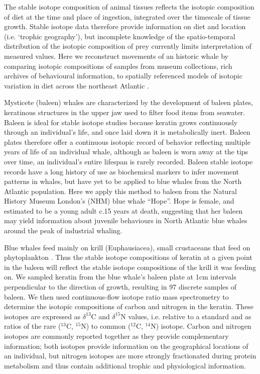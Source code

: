 \documentclass[a4paper,12pt]{article}
\begin{document}
The stable isotope composition of animal tissues reflects the isotopic composition of diet at the time and place of ingestion, integrated over the timescale of tissue growth. 
Stable isotope data therefore provide information on diet and location (i.e. `trophic geography'\cite{bird2018global}), but incomplete knowledge of the spatio-temporal distribution of the isotopic composition of prey currently limits interpretation of measured values. 
Here we reconstruct movements of an historic whale by comparing isotopic compositions of samples from museum collections, rich archives of behavioural information\cite{lister2011natural}, to spatially referenced models of isotopic variation in diet across the northeast Atlantic \cite{hobson1999tracing,hobson2008tracking,eisenmann2016isotopic}. 

Mysticete (baleen) whales are characterized by the development of baleen plates, keratinous structures in the upper jaw used to filter food items from seawater. 
Baleen is ideal for stable isotope studies because keratin grows continuously through an individual's life, and once laid down it is metabolically inert\cite{best1996stable}. 
Baleen plates therefore offer a continuous isotopic record of behavior reflecting multiple years of life of an individual whale, although as baleen is worn away at the tips over time, an individual's entire lifespan is rarely recorded. 
Baleen stable isotope records have a long history of use as biochemical markers to infer movement patterns in whales\cite{ryan2013stable,best1996stable,hobson1998stable,hobson2008tracking}, but have yet to be applied to blue whales from the North Atlantic population. 
Here we apply this method to baleen from the Natural History Museum London's (NHM) blue whale ``Hope''. 
Hope is female, and estimated to be a young adult c.15 years at death, suggesting that her baleen may yield information about juvenile behaviours in North Atlantic blue whales around the peak of industrial whaling.
 
Blue whales feed mainly on krill (Euphausiacea), small crustaceans that feed on phytoplankton \cite{handbook}.
Thus the stable isotope compositions of keratin at a given point in the baleen will reflect the stable isotope compositions of the krill it was feeding on.
We sampled keratin from the blue whale's baleen plate at 1cm intervals perpendicular to the direction of growth, resulting in 97 discrete samples of baleen.
We then used continuous-flow isotope ratio mass spectrometry to determine the isotopic compositions of carbon and nitrogen in the keratin.
These isotopes are expressed as $\delta^{13}$C and $\delta^{15}$N values, i.e. relative to a standard and as ratios of the rare ($^{13}$C, $^{15}$N) to common ($^{12}$C, $^{14}$N) isotope\cite{west2006stable}.
Carbon and nitrogen isotopes are commonly reported together as they provide complementary information; both isotopes provide information on the geographical locations of an individual, but nitrogen isotopes are more strongly fractionated during protein metabolism and thus contain additional trophic and physiological information\cite{west2006stable}.
\end{document}
